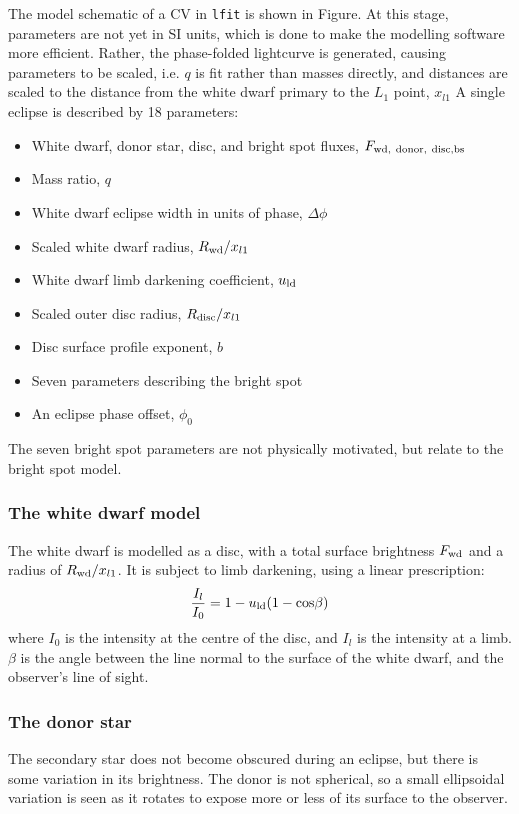 The model schematic of a CV in \lstinline{lfit} is shown in Figure. At this stage, parameters are not yet in SI units, which is done to make the modelling software more efficient. Rather, the phase-folded lightcurve is generated, causing parameters to be scaled, i.e. $q$ is fit rather than masses directly, and distances are scaled to the distance from the white dwarf primary to the $L_1$ point, $x_{l1}$
A single eclipse is described by 18 parameters:
\begin{itemize}
    \item White dwarf, donor star, disc, and bright spot fluxes, $F_{\rm wd,\ donor,\ disc, bs}$
    \item Mass ratio, $q$
    \item White dwarf eclipse width in units of phase, $\Delta \phi$
    \item Scaled white dwarf radius, $R_{\rm wd} / x_{l1}$
    \item White dwarf limb darkening coefficient, $u_{\rm ld}$
    \item Scaled outer disc radius, $R_{\rm disc} / x_{l1}$
    \item Disc surface profile exponent, $b$
    \item Seven parameters describing the bright spot
    \item An eclipse phase offset, $\phi_0$
\end{itemize}
The seven bright spot parameters are not physically motivated, but relate to the bright spot model. 

\subsubsection{The white dwarf model}

The white dwarf is modelled as a disc, with a total surface brightness $F_{\rm wd}$ and a radius of $R_{\rm wd} / x_{l1}$. It is subject to limb darkening, using a linear prescription:
\begin{equation}
    \frac{I_l}{I_0} = 1 - u_{\rm ld}(1 - {\rm cos}\beta)
\end{equation}
where $I_0$ is the intensity at the centre of the disc, and $I_l$ is the intensity at a limb. $\beta$ is the angle between the line normal to the surface of the white dwarf, and the observer's line of sight. 

\subsubsection{The donor star}
The secondary star does not become obscured during an eclipse, but there is some variation in its brightness. The donor is not spherical, so a small ellipsoidal variation is seen as it rotates to expose more or less of its surface to the observer.

